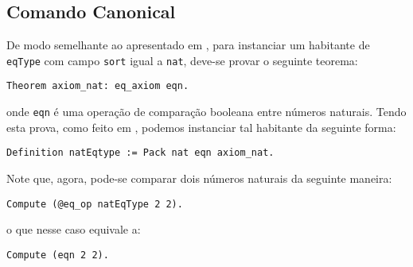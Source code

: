 \subsection{Comando Canonical} De modo semelhante ao apresentado em \cite{assia_mahboubi_2022_7118596}, para instanciar um habitante de \lstinline[language = coq]$eqType$ com campo \lstinline[language = coq]$sort$ igual a \lstinline[language = coq]$nat$, deve-se provar o seguinte teorema:
    \begin{lstlisting}[language=coq,frame=single,tabsize=1]
Theorem axiom_nat: eq_axiom eqn.
    \end{lstlisting}
onde \lstinline[language = coq]$eqn$ é uma operação de comparação booleana entre números naturais.
Tendo esta prova, como feito em \cite{assia_mahboubi_2022_7118596}, podemos instanciar tal habitante
da seguinte forma:
    \begin{lstlisting}[language=coq,frame=single,tabsize=1]
Definition natEqtype := Pack nat eqn axiom_nat.
    \end{lstlisting}
Note que, agora, pode-se comparar dois números naturais da seguinte maneira:
    \begin{lstlisting}[language=coq,frame=single,tabsize=1]
Compute (@eq_op natEqType 2 2).
    \end{lstlisting}
o que nesse caso equivale a:
    \begin{lstlisting}[language=coq,frame=single,tabsize=1]
Compute (eqn 2 2).
    \end{lstlisting}

